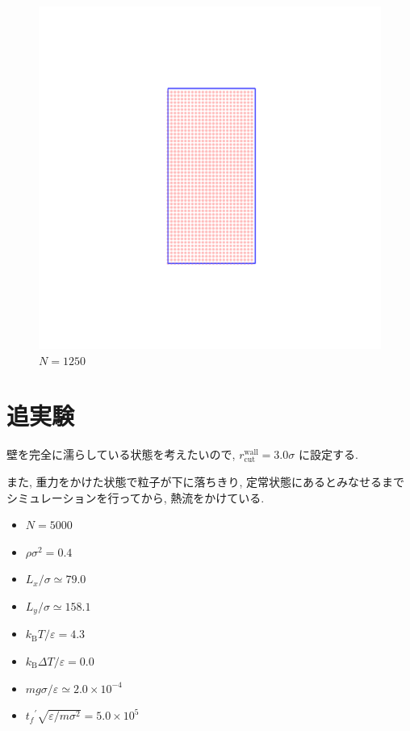 \begin{figure}[H]
  \centering
  \includegraphics[scale=0.2]{image/initial1250.png}
  \caption{$N=1250$}
  \label{}
\end{figure}

\section{追実験}

壁を完全に濡らしている状態を考えたいので, $r^{\text{wall}}_{\text{cut}}=3.0\sigma$ に設定する.

また, 重力をかけた状態で粒子が下に落ちきり, 定常状態にあるとみなせるまでシミュレーションを行ってから, 熱流をかけている.\cite{Yoshida}

\begin{itemize}
  \item $N = 5000$
  \item $\rho \sigma^2 = 0.4$
  \item $L_x / \sigma \simeq 79.0$
  \item $L_y / \sigma \simeq 158.1$
  \item $k_{\text{B}} T/\varepsilon = 4.3$
  \item $k_{\text{B}} \Delta T/\varepsilon = 0.0$
  \item $mg\sigma/\varepsilon \simeq 2.0 \times 10^{-4}$
  \item ${t_f}^{\prime} \sqrt{\varepsilon / m \sigma^2} = 5.0 \times 10^{5}$
\end{itemize}


